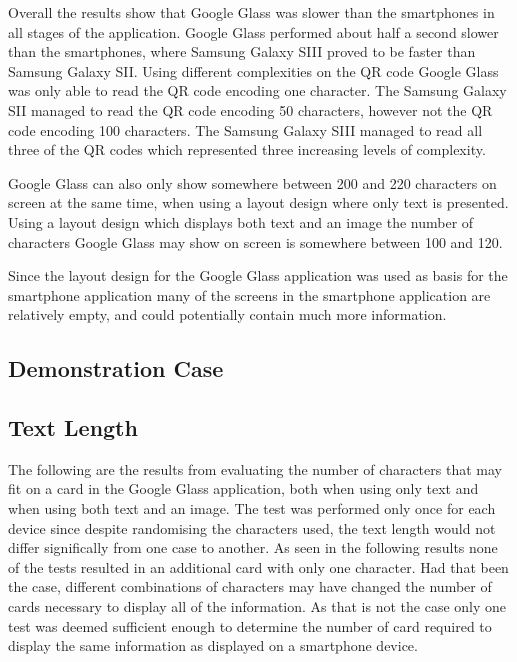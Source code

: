 Overall the results show that Google Glass was slower than the smartphones in all stages of the application. Google Glass performed about half a second slower than the smartphones, where Samsung Galaxy SIII proved to be faster than Samsung Galaxy SII. Using different complexities on the QR code Google Glass was only able to read the QR code encoding one character. The Samsung Galaxy SII managed to read the QR code encoding 50 characters, however not the QR code encoding 100 characters. The Samsung Galaxy SIII managed to read all three of the QR codes which represented three increasing levels of complexity.

Google Glass can also only show somewhere between 200 and 220 characters on screen at the same time, when using a layout design where only text is presented. Using a layout design which displays both text and an image the number of characters Google Glass may show on screen is somewhere between 100 and 120.

Since the layout design for the Google Glass application was used as basis for the smartphone application many of the screens in the smartphone application are relatively empty, and could potentially contain much more information.

\subsection{Demonstration Case}



\subsection{Text Length}
The following are the results from evaluating the number of characters that may fit on a card in the Google Glass application, both when using only text and when using both text and an image. The test was performed only once for each device since despite randomising the characters used, the text length would not differ significally from one case to another. As seen in the following results none of the tests resulted in an additional card with only one character. Had that been the case, different combinations of characters may have changed the number of cards necessary to display all of the information. As that is not the case only one test was deemed sufficient enough to determine the number of card required to display the same information as displayed on a smartphone device.


